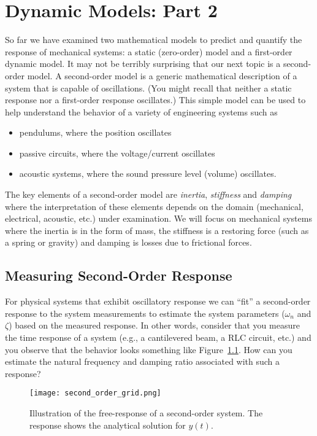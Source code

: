 \chapter{Dynamic Models: Part 2}\label{c:model2}
So far we have examined two mathematical models to predict and quantify the response of mechanical systems: a static (zero-order) model and a first-order dynamic model.  It may not be terribly surprising that our next topic is a second-order model.  A second-order model is a generic mathematical description of a system that is capable of oscillations. (You might recall that neither a static response nor a first-order response oscillates.)   This simple model can be used to help understand the behavior of a variety of engineering systems such as
\begin{itemize}
\item pendulums, where the position oscillates
\item passive circuits, where the voltage/current oscillates 
\item acoustic systems, where the sound pressure level (volume) oscillates.
\end{itemize}

The key elements of a second-order model are \emph{inertia}, \emph{stiffness} and \emph{damping} where the interpretation of these elements depends on the domain (mechanical, electrical, acoustic, etc.) under examination.  We will focus on mechanical systems where the inertia is in the form of mass, the stiffness is a restoring force (such as a spring or gravity) and damping is losses due to frictional forces.





\section{Measuring Second-Order Response}
For physical systems that exhibit oscillatory response we can ``fit'' a second-order response to the system measurements to estimate the system parameters ($\omega_n$ and $\zeta$) based on the measured response.  In other words, consider that you measure the time response of a system (e.g., a cantilevered beam, a RLC circuit, etc.) and you observe that the behavior looks something like Figure~\ref{f:secondfreeresp}.  How can you estimate the natural frequency and damping ratio associated with such a response?

\begin{figure}[h!bt]
\centerline{
{\texttt{[image: second\_order\_grid.png]}}}
\caption{Illustration of the free-response of a second-order system.  The response shows the analytical solution for $y(t)$.}
\label{f:secondfreeresp}
\end{figure}

